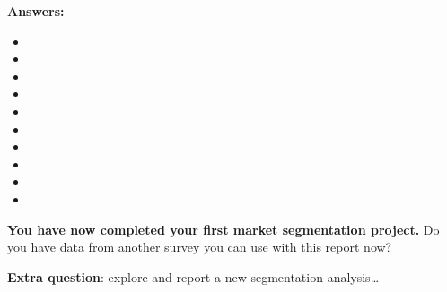 \documentclass[
]{article}
\providecommand{\tightlist}{%
  \setlength{\itemsep}{0pt}\setlength{\parskip}{0pt}}
\begin{document}
\textbf{Answers:}

\begin{itemize}
\tightlist
\item
\item
\item
\item
\item
\item
\item
\item
\item
\item
\end{itemize}

\textbf{You have now completed your first market segmentation project.}
Do you have data from another survey you can use with this report now?

\textbf{Extra question}: explore and report a new segmentation
analysis\ldots{}
\end{document}
